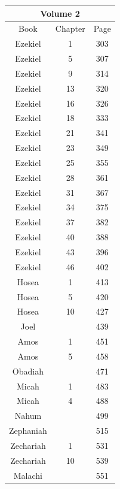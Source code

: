 \documentclass{article}
\newlength{\minipageheight}
\newlength{\minipagewidth}
\begin{document}
\begin{minipage}[l][\minipageheight][t]{\minipagewidth}%
    \begin{center}
        \renewcommand{\arraystretch}{1.0}
        \begin{tabular}{|c|c|c|}
            \hline
            \multicolumn{3}{|c|}{Volume 2} \\
            \hline
            Book      & Chapter & Page     \\
            \hline
            Ezekiel   & 1       & 303      \\
            Ezekiel   & 5       & 307      \\
            Ezekiel   & 9       & 314      \\
            Ezekiel   & 13      & 320      \\
            Ezekiel   & 16      & 326      \\
            Ezekiel   & 18      & 333      \\
            Ezekiel   & 21      & 341      \\
            Ezekiel   & 23      & 349      \\
            Ezekiel   & 25      & 355      \\
            Ezekiel   & 28      & 361      \\
            Ezekiel   & 31      & 367      \\
            Ezekiel   & 34      & 375      \\
            Ezekiel   & 37      & 382      \\
            Ezekiel   & 40      & 388      \\
            Ezekiel   & 43      & 396      \\
            Ezekiel   & 46      & 402      \\
            Hosea     & 1       & 413      \\
            Hosea     & 5       & 420      \\
            Hosea     & 10      & 427      \\
            Joel      &         & 439      \\
            Amos      & 1       & 451      \\
            Amos      & 5       & 458      \\
            Obadiah   &         & 471      \\
            Micah     & 1       & 483      \\
            Micah     & 4       & 488      \\
            Nahum     &         & 499      \\
            Zephaniah &         & 515      \\
            Zechariah & 1       & 531      \\
            Zechariah & 10      & 539      \\
            Malachi   &         & 551      \\
            \hline
        \end{tabular}
    \end{center}
\end{minipage}%
\end{document}
